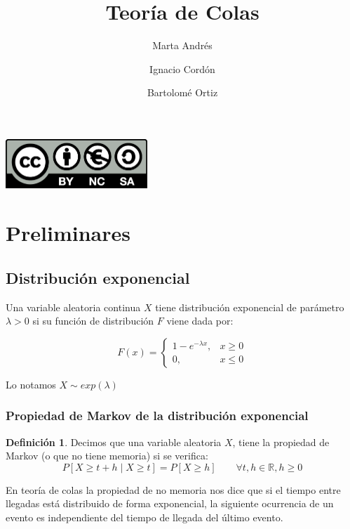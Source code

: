 \documentclass[a4paper,10pt]{scrartcl}
\title{Teoría de Colas}
\author{
  Marta Andrés\and
  Ignacio Cordón\and
  Bartolomé Ortiz\and
}
\date{}
\theoremstyle{definition}
\newtheorem*{mydef}{Definición}
\numberwithin{equation}{section}
\begin{document}
\maketitle

\begin{center}
	\includegraphics[width=0.4\textwidth]{./imgs/by-nc-sa.png}
\end{center}

\tableofcontents
\pagebreak

\section{Preliminares}

\subsection{Distribución exponencial}

Una variable aleatoria continua $X$ tiene distribución exponencial de parámetro $\lambda > 0$ si su función de distribución
$F$ viene dada por:

\[F(x) = \left\{\begin{array}{ll}
         1- e^{-\lambda x} ,& x\ge 0\\
         0 ,& x\le 0
         \end{array}\right.\]
         
Lo notamos $X \sim exp(\lambda)$

\subsubsection{Propiedad de Markov de la distribución exponencial}

\begin{mydef}
 Decimos que una variable aleatoria $X$, tiene la propiedad de Markov (o que no tiene memoria) si se verifica:
 \[P[X \ge t+h \mid X \ge t] = P[X \ge h] \qquad \forall t,h \in \mathbb{R}, h\ge 0\]
\end{mydef}

En teoría de colas la propiedad de no memoria nos dice que si el tiempo entre llegadas está distribuido de forma exponencial, la siguiente ocurrencia de
un evento es independiente del tiempo de llegada del último evento.
\end{document}
